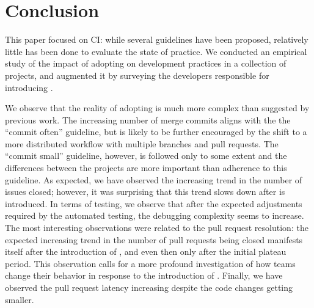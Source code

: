 
\section{Conclusion}
\label{sec:conc}

This paper focused on CI: while several guidelines have been proposed, relatively little has been done to evaluate the 
state of practice.
We conducted an 
empirical study of the impact of adopting \Tvis on development practices in a collection of \GH projects,
and augmented it by surveying the developers responsible for introducing \Tvis. %

We observe that the reality of adopting \Tvis is much more complex than suggested by previous work.
The increasing number of merge commits aligns with the the ``commit often'' guideline, but is likely to be further encouraged by the shift to a more distributed workflow with multiple branches and pull requests.
The ``commit small'' guideline, however, is followed only to some extent and the differences between the projects are more important than adherence to this guideline.
As expected, we have observed the increasing trend in the number of issues closed; however, it was surprising that this trend slows down after \Tvis is introduced.
In terms of testing, we observe that after the expected adjustments required by the automated testing, the debugging complexity seems to increase. 
The most interesting observations were related to the pull request resolution: the expected increasing trend in the number of pull requests being closed manifests itself after the introduction of \Tvis, and even then only after the initial plateau period. 
This observation calls for a more profound investigation of how \GH teams change their behavior in response to the introduction of \Tvis. 
Finally, we have observed the pull request latency increasing  despite the code changes getting smaller.
